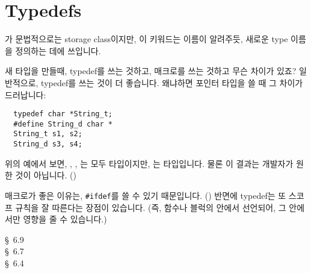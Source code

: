 \section{Typedefs}	\label{sec:typedef}
가 문법적으로는 storage class이지만, 이 키워드는 
이름이 알려주듯, 새로운 type 이름을 정의하는 데에
쓰입니다.

\begin{faq}
        새 타입을 만들때, typedef를 쓰는 것하고, 매크로를 쓰는 것하고 무슨 
        차이가 있죠?
\A
        일반적으로, typedef를 쓰는 것이 더 좋습니다. 왜냐하면 포인터 타입을
        쓸 때 그 차이가 드러납니다:
\begin{verbatim}
  typedef char *String_t;
  #define String_d char *
  String_t s1, s2;
  String_d s3, s4;
\end{verbatim}
        위의 예에서 보면, , , 는 모두 
        타입이지만, 는  타입입니다. 물론 이 결과는 개발자가
        원한 것이 아닙니다.
        ()

        매크로가 좋은 이유는, \verb+#ifdef+를 쓸 수 있기 때문입니다. 
        () 반면에 typedef는 또 스코프 규칙을 잘 
        따른다는 장점이 있습니다. (즉, 함수나 블럭의 안에서 선언되어,
        그 안에서만 영향을 줄 수 있습니다.)

\R
        \cite{kr1} \S\ 6.9  \\
        \cite{kr2} \S\ 6.7  \\
        \cite{ctp} \S\ 6.4 
\end{faq}

